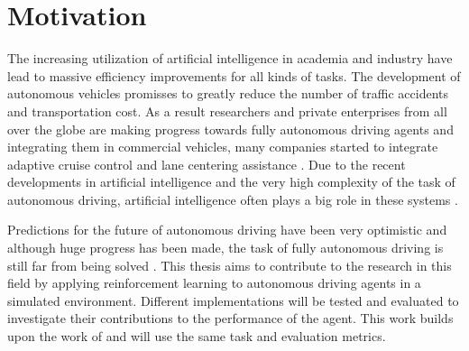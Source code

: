 \chapter{Motivation}
\label{cha:Motivation}

The increasing utilization of artificial intelligence in academia and industry have lead to massive efficiency improvements for all kinds of tasks. The development of autonomous vehicles promisses to greatly reduce the number of traffic accidents and transportation cost. As a result researchers and private enterprises from all over the globe are making progress towards fully autonomous driving agents and integrating them in commercial vehicles, many companies started to integrate adaptive cruise control and lane centering assistance \autocite{carreviews}. Due to the recent developments in artificial intelligence and the very high complexity of the task of autonomous driving, artificial intelligence often plays a big role in these systems \autocite{teslaEndToEnd}.

Predictions for the future of autonomous driving have been very optimistic and although huge progress has been made, the task of fully autonomous driving is still far from being solved \autocite{state_of_autonomous_driving2023}. This thesis aims to contribute to the research in this field by applying reinforcement learning to autonomous driving agents in a simulated environment. Different implementations will be tested and evaluated to investigate their contributions to the performance of the agent. This work builds upon the work of \autocite{maximilian} and will use the same task and evaluation metrics. %







